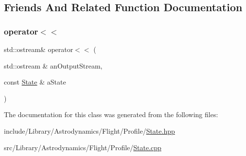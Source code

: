 \subsection{Friends And Related Function Documentation}
\mbox{\label{classlibrary_1_1astro_1_1flight_1_1profile_1_1_state_abba03f039f2534d691a1dc28426e8b89}} 
\subsubsection{\texorpdfstring{operator$<$$<$}{operator<<}}
{\footnotesize\ttfamily std\+::ostream\& operator$<$$<$ (\begin{DoxyParamCaption}\item[{std\+::ostream \&}]{an\+Output\+Stream,  }\item[{const \hyperlink{classlibrary_1_1astro_1_1flight_1_1profile_1_1_state}{State} \&}]{a\+State }\end{DoxyParamCaption})\hspace{0.3cm}{\ttfamily [friend]}}



The documentation for this class was generated from the following files\+:\begin{DoxyCompactItemize}
\item 
include/\+Library/\+Astrodynamics/\+Flight/\+Profile/\hyperlink{_flight_2_profile_2_state_8hpp}{State.\+hpp}\item 
src/\+Library/\+Astrodynamics/\+Flight/\+Profile/\hyperlink{_flight_2_profile_2_state_8cpp}{State.\+cpp}\end{DoxyCompactItemize}
